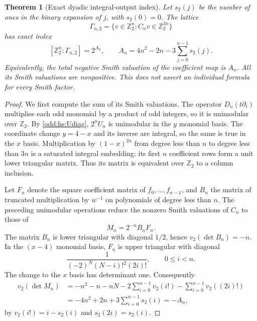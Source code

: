 \documentclass[11pt,a4paper]{article}
\numberwithin{equation}{section}
\newtheorem{theorem}{Theorem}[section]
\theoremstyle{definition}\newtheorem{definition}[theorem]{Definition}
\theoremstyle{remark}\newtheorem{remark}[theorem]{Remark}
\begin{document}
\begin{theorem}[Exact dyadic integral-output index]\label{odd:hs:binary}
Let $s_2(j)$ be the number of ones in the binary expansion of $j$, with
$s_2(0)=0$. The lattice
\[
 \Gamma_{n,2}=\{v\in\mathbb Z_2^n:C_nv\in\mathbb Z_2^{3n}\}
\]
has exact index
\begin{equation}\label{odd:hs:index2}
 [\mathbb Z_2^n:\Gamma_{n,2}]
       =2^{A_n},\qquad
 A_n=4n^2-2n-3\sum_{j=0}^{n-1}s_2(j).
\end{equation}
Equivalently, the total negative Smith valuation of the coefficient map
is $A_n$. All its Smith valuations are nonpositive. This does not assert
an individual formula for every Smith factor.
\end{theorem}
\begin{proof}
We first compute the sum of its Smith valuations. The operator
$D_n(t\partial_t)$ multiplies each odd monomial by a product of odd
integers, so it is unimodular over $\mathbb Z_2$. By \eqref{odd:hs:Udiag},
$2^nU_n$ is unimodular in the $y$ monomial basis. The coordinate change
$y=4-x$ and its inverse are integral, so the same is true in the $x$ basis.
Multiplication by $(1-x)^{2n}$ from degree less than $n$ to degree less
than $3n$ is a saturated integral embedding: its first $n$ coefficient
rows form a unit lower triangular matrix. Thus its matrix is equivalent
over $\mathbb Z_2$ to a column inclusion.

Let $F_n$ denote the square coefficient matrix of $f_0,\ldots,f_{n-1}$,
and $B_n$ the matrix of truncated multiplication by $w^{-1}$ on
polynomials of degree less than $n$. The preceding unimodular operations
reduce the nonzero Smith valuations of $C_n$ to those of
\[
 M_n=2^{-n}B_nF_n.
\]
The matrix $B_n$ is lower triangular with diagonal $1/2$, hence
$v_2(\det B_n)=-n$. In the $(x-4)$ monomial basis, $F_n$ is upper
triangular with diagonal
\[
 \frac{1}{(-2)^N(N-i)!^2(2i)!},\qquad 0\le i<n.
\]
The change to the $x$ basis has determinant one. Consequently
\begin{align*}
 v_2(\det M_n)
 &=-n^2-n-nN-2\sum_{i=0}^{n-1}v_2(i!)
                         -\sum_{i=0}^{n-1}v_2((2i)!)\\
 &=-4n^2+2n+3\sum_{i=0}^{n-1}s_2(i)=-A_n,
\end{align*}
by $v_2(i!)=i-s_2(i)$ and $s_2(2i)=s_2(i)$.


\end{proof}
\end{document}
